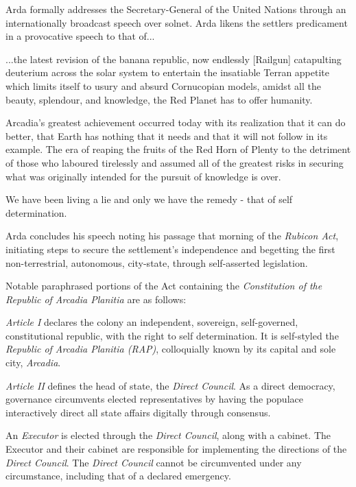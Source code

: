 Arda formally addresses the Secretary-General of the United Nations through an internationally broadcast speech over solnet. Arda likens the settlers predicament in a provocative speech to that of...
\crlf

\startTimelineDocument
...the latest revision of the banana republic, now endlessly [Railgun] catapulting deuterium across the solar system to entertain the insatiable Terran appetite which limits itself to usury and absurd Cornucopian models, amidst all the beauty, splendour, and knowledge, the Red Planet has to offer humanity.

Arcadia's greatest achievement occurred today with its realization that it can do better, that Earth has nothing that it needs and that it will not follow in its example. The era of reaping the fruits of the Red Horn of Plenty to the detriment of those who laboured tirelessly and assumed all of the greatest risks in securing what was originally intended for the pursuit of knowledge is over. 

We have been living a lie and only we have the remedy - that of self determination.
\stopTimelineDocument
\crlf

Arda concludes his speech noting his passage that morning of the {\it Rubicon Act}, initiating steps to secure the settlement's independence and begetting the first non-terrestrial, autonomous, city-state, through self-asserted legislation. 

Notable paraphrased portions of the Act containing the {\it Constitution of the Republic of Arcadia Planitia} are as follows:
\crlf

\startTimelineDocument
\startitemize[5]
\setupwhitespace[big]
\item {\it Article I} declares the colony an independent, sovereign, self-governed, constitutional republic, with the right to self determination. It is self-styled the {\it Republic of Arcadia Planitia (RAP)}, colloquially known by its capital and sole city, {\it Arcadia}.

\item {\it Article II} defines the head of state, the {\it Direct Council}. As a direct democracy, governance circumvents elected representatives by having the populace interactively direct all state affairs digitally through consensus. 

An {\it Executor} is elected through the {\it Direct Council}, along with a cabinet. The Executor and their cabinet are responsible for implementing the directions of the {\it Direct Council}. The {\it Direct Council} cannot be circumvented under any circumstance, including that of a declared emergency.


